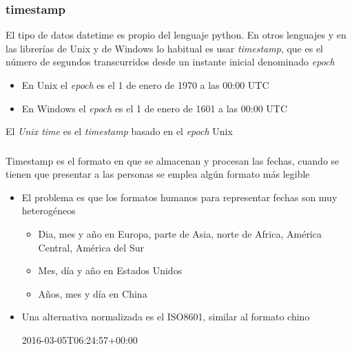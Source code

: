 \documentclass[ucs]{beamer}
\begin{document}
\begin{frame}[fragile]
\frametitle{timestamp}

El tipo de datos datetime es propio del lenguaje python. En otros
lenguajes y en las librerías de Unix y de Windows lo habitual es usar 
\emph{timestamp}, que es el número de segundos transcurridos desde
un instante inicial denominado \emph{epoch}

\begin{itemize}
\item
En Unix el \emph{epoch} es el 1 de enero de 1970 a las 00:00 UTC
\item
En Windows el \emph{epoch} es el 1 de enero de 1601 a las 00:00 UTC
\end{itemize}

El \emph{Unix time} es el \emph{timestamp} basado en el \emph{epoch} Unix


\end{frame}
\begin{frame}[fragile]
\frametitle{}

Timestamp es el formato en que se almacenan y procesan las fechas, cuando
se tienen que presentar a las personas se emplea algún formato más legible

\begin{itemize}
\item
El problema es que los formatos humanos para representar fechas son muy
heterogéneos

\begin{itemize}
\item
Dia, mes y año en Europa, parte de Asia, norte de Africa, América Central,
América del Sur
\item
Mes, día y año en Estados Unidos
\item
Años, mes y día en China
\end{itemize}
\item
Una alternativa normalizada es el ISO8601, similar al formato chino

2016-03-05T06:24:57+00:00

\end{itemize}
\end{frame}
\end{document}
